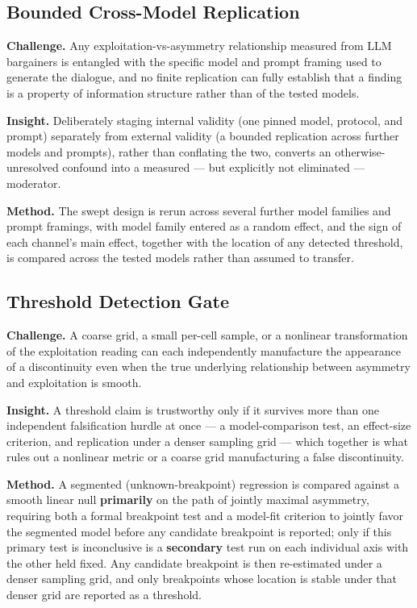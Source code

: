 \documentclass[11pt]{article}
\begin{document}
\subsection{Bounded Cross-Model Replication}
\textbf{Challenge.} Any exploitation-vs-asymmetry relationship measured from LLM bargainers is entangled with the specific model and prompt framing used to generate the dialogue, and no finite replication can fully establish that a finding is a property of information structure rather than of the tested models.

\textbf{Insight.} Deliberately staging internal validity (one pinned model, protocol, and prompt) separately from external validity (a bounded replication across further models and prompts), rather than conflating the two, converts an otherwise-unresolved confound into a measured --- but explicitly not eliminated --- moderator.

\textbf{Method.} The swept design is rerun across several further model families and prompt framings, with model family entered as a random effect, and the sign of each channel's main effect, together with the location of any detected threshold, is compared across the tested models rather than assumed to transfer.

\subsection{Threshold Detection Gate}
\textbf{Challenge.} A coarse grid, a small per-cell sample, or a nonlinear transformation of the exploitation reading can each independently manufacture the appearance of a discontinuity even when the true underlying relationship between asymmetry and exploitation is smooth.

\textbf{Insight.} A threshold claim is trustworthy only if it survives more than one independent falsification hurdle at once --- a model-comparison test, an effect-size criterion, and replication under a denser sampling grid --- which together is what rules out a nonlinear metric or a coarse grid manufacturing a false discontinuity.

\textbf{Method.} A segmented (unknown-breakpoint) regression is compared against a smooth linear null \textbf{primarily} on the path of jointly maximal asymmetry, requiring both a formal breakpoint test and a model-fit criterion to jointly favor the segmented model before any candidate breakpoint is reported; only if this primary test is inconclusive is a \textbf{secondary} test run on each individual axis with the other held fixed. Any candidate breakpoint is then re-estimated under a denser sampling grid, and only breakpoints whose location is stable under that denser grid are reported as a threshold.
\end{document}
